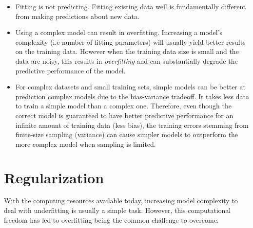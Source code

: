 \begin{itemize}
	\item Fitting is not predicting. Fitting existing data well is fundamentally
	different from making predictions about new data.
	\item Using a complex model can result in overfitting. Increasing a model's
	complexity  (i.e number of fitting parameters) will usually yield better results
	on the training data. However when the training data size is small and the data
	are noisy, this results in \textit{overfitting} and can substantially degrade the
	predictive performance of the model.
	\item For complex datasets and small training sets, simple models can be better
	at prediction complex models due to the bias-variance tradeoff. It takes less
	data to train a simple model than a complex one. Therefore, even though the 
	correct model is guaranteed to have better predictive performance for an infinite
	amount of training data (less bias), the training errors stemming from finite-size
	sampling (variance) can cause simpler models to outperform the more complex model
	when sampling is limited.

\end{itemize}


\section{Regularization}\label{section:regularization}
With the computing resources available today, increasing model complexity to deal 
with underfitting is usually a simple task. However, this computational freedom 
has led to overfitting being the common challenge to overcome.

